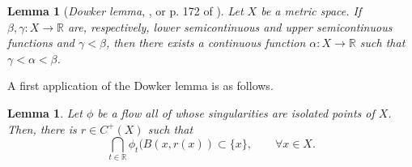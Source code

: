\documentclass[11pt,letterpaper]{amsart}
\newtheorem{lemma}[thm]{Lemma}
\begin{document}
\begin{lemma}[\emph{Dowker lemma}, \cite{d}, \cite{h} or p. 172 of \cite{k}]
\label{dl}
Let \(X\) be a metric space. If \(\beta,\gamma:X\to \mathbb{R}\) are, respectively, lower semicontinuous and upper semicontinuous functions and \(\gamma<\beta\), then there exists a continuous function \(\alpha:X\to\mathbb{R}\) such that $\gamma<\alpha<\beta$.
\end{lemma}

A first application of the Dowker lemma is as follows.

\begin{lemma}
\label{pura}
Let $\phi$ be a flow all of whose singularities are isolated points of $X$. Then,
there is $r\in C^+(X)$ such that
$$
\bigcap_{t\in\mathbb{R}}\phi_t(B(x,r(x))\subset \{x\},\quad\quad\forall x\in X.
$$
\end{lemma}
\end{document}
